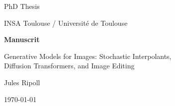 \begin{titlepage}
\centering
\vspace*{2cm}

{\large PhD Thesis \par}
\vspace{0.5cm}
{\large INSA Toulouse / Université de Toulouse \par}

\vfill
{\Huge\bfseries Manuscrit \par}
\vspace{1cm}
{\large Generative Models for Images: Stochastic Interpolants,\\
Diffusion Transformers, and Image Editing \par}

\vfill
{\large Jules Ripoll \par}
\vspace{0.5cm}
{\large \today \par}

\vspace{2cm}
\end{titlepage}
